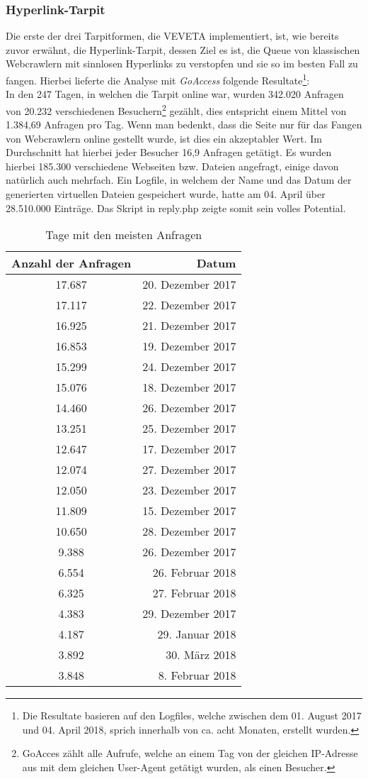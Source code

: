 \subsubsection{Hyperlink-Tarpit}
Die erste der drei Tarpitformen, die VEVETA implementiert, ist, wie bereits zuvor erwähnt, die Hyperlink-Tarpit, dessen Ziel es ist, die Queue von klassischen Webcrawlern mit sinnlosen Hyperlinks zu verstopfen und sie so im besten Fall zu fangen. Hierbei lieferte die Analyse mit \emph{GoAccess} folgende Resultate\footnote{Die Resultate basieren auf den Logfiles, welche zwischen dem 01. August 2017 und 04. April 2018, sprich innerhalb von ca. acht Monaten, erstellt wurden.}:\\
In den 247 Tagen, in welchen die Tarpit online war, wurden 342.020 Anfragen von 20.232 verschiedenen Besuchern\footnote{GoAcces zählt alle Aufrufe, welche an einem Tag von der gleichen IP-Adresse aus mit dem gleichen User-Agent getätigt wurden, als einen Besucher.} gezählt, dies entspricht einem Mittel von 1.384,69 Anfragen pro Tag. Wenn man bedenkt, dass die Seite nur für das Fangen von Webcrawlern online gestellt wurde, ist dies ein akzeptabler Wert. Im Durchschnitt hat hierbei jeder Besucher 16,9 Anfragen getätigt. Es wurden hierbei 185.300 verschiedene Webseiten bzw. Dateien angefragt, einige davon natürlich auch mehrfach. Ein Logfile, in welchem der Name und das Datum der generierten virtuellen Dateien gespeichert wurde, hatte am 04. April über 28.510.000 Einträge. Das Skript in reply.php zeigte somit sein volles Potential.
\begin{table}[htb!]
	\centering
	\begin{tabular}{c|r}
		\textbf{Anzahl der Anfragen}&\textbf{Datum}\\\hline
		17.687&20. Dezember 2017\\
		17.117&22. Dezember 2017\\
		16.925&21. Dezember 2017\\
		16.853&19. Dezember 2017\\
		15.299&24. Dezember 2017\\
		15.076&18. Dezember 2017\\
		14.460&26. Dezember 2017\\
		13.251&25. Dezember 2017\\
		12.647&17. Dezember 2017\\
		12.074&27. Dezember 2017\\
		12.050&23. Dezember 2017\\
		11.809&15. Dezember 2017\\
		10.650&28. Dezember 2017\\
		9.388&26. Dezember 2017\\
		6.554&26. Februar 2018\\
		6.325&27. Februar 2018\\
		4.383&29. Dezember 2017\\
		4.187&29. Januar 2018\\
		3.892&30. März 2018\\
		3.848&8. Februar 2018\\
	\end{tabular}
	\caption{Tage mit den meisten Anfragen}
	\label{tab:top-hits}
\end{table}
